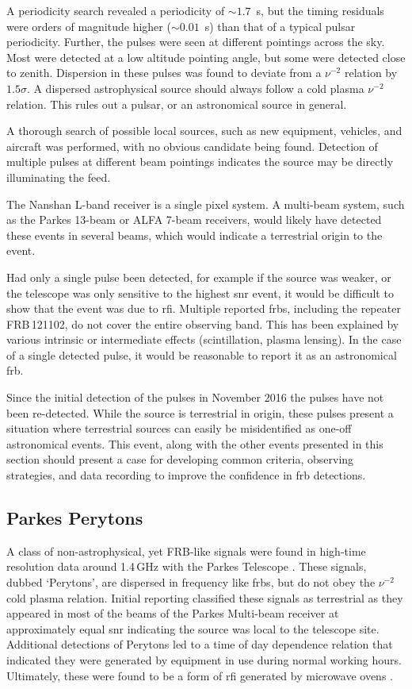 \documentclass[a4paper,fleqn,usenatbib]{mnras}
\begin{document}
A periodicity search revealed a periodicity of $\sim 1.7$~s, but the timing
residuals were orders of magnitude higher \mbox{($\sim 0.01$~s)} than that of a
typical pulsar periodicity. Further, the pulses were seen at different pointings
across the sky.  Most were detected at a low altitude pointing angle, but some
were detected close to zenith.  Dispersion in these pulses was found to deviate
from a $\nu^{-2}$ relation by $1.5 \sigma$. A dispersed astrophysical source
should always follow a cold plasma $\nu^{-2}$ relation.  This rules out a
pulsar, or an astronomical source in general.

A thorough search of possible local sources, such as new equipment, vehicles,
and aircraft was performed, with no obvious candidate being found. Detection of
multiple pulses at different beam pointings indicates the source may be directly
illuminating the feed.

The Nanshan L-band receiver is a single pixel system. A multi-beam system, such
as the Parkes 13-beam or ALFA 7-beam receivers, would likely have detected these
events in several beams, which would indicate a terrestrial origin to the event.

Had only a single pulse been detected, for example if the source was weaker, or
the telescope was only sensitive to the highest \gls{snr} event, it would be
difficult to show that the event was due to \gls{rfi}.  Multiple reported
\glspl{frb}, including the repeater FRB\,121102, do not cover the entire observing
band. This has been explained by various intrinsic or intermediate effects
(scintillation, plasma lensing). In the case of a single detected pulse, it would
be reasonable to report it as an astronomical \gls{frb}.

Since the initial detection of the pulses in November 2016 the pulses have not
been re-detected. While the source is terrestrial in origin, these pulses
present a situation where terrestrial sources can easily be misidentified as
one-off astronomical events. This event, along with the other events presented
in this section should present a case for developing common criteria, observing
strategies, and data recording to improve the confidence in \gls{frb}
detections.

\subsection{Parkes Perytons}
\label{sec:perytons}

A class of non-astrophysical, yet FRB-like signals were found in high-time
resolution data around 1.4\,GHz with the Parkes Telescope
\citep{2011ApJ...727...18B}. These signals, dubbed `Perytons', are dispersed in
frequency like \glspl{frb}, but do not obey the $\nu^{-2}$ cold plasma relation.
Initial reporting classified these signals as terrestrial as they appeared in
most of the beams of the Parkes Multi-beam receiver at approximately equal
\gls{snr} indicating the source was local to the telescope site. Additional
detections of Perytons led to a time of day dependence relation that indicated
they were generated by equipment in use during normal working hours.
Ultimately, these were found to be a form of \gls{rfi} generated by microwave
ovens \citep{2015MNRAS.451.3933P}.
\end{document}

